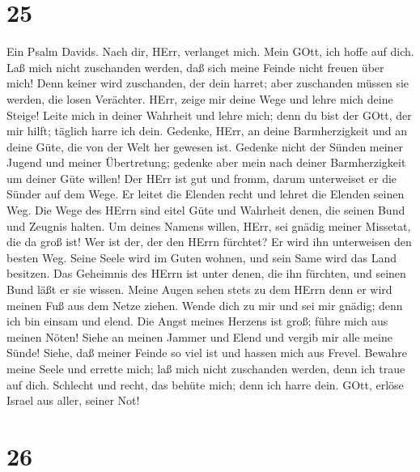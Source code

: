 \hypertarget{section-24}{%
\section{25}\label{section-24}}

 Ein Psalm Davids. Nach dir, HErr, verlanget mich.
 Mein GOtt, ich hoffe auf dich. Laß mich nicht zuschanden
werden, daß sich meine Feinde nicht freuen über mich!  Denn
keiner wird zuschanden, der dein harret; aber zuschanden müssen sie
werden, die losen Verächter.  HErr, zeige mir deine Wege und
lehre mich deine Steige!  Leite mich in deiner Wahrheit und
lehre mich; denn du bist der GOtt, der mir hilft; täglich harre ich
dein.  Gedenke, HErr, an deine Barmherzigkeit und an deine
Güte, die von der Welt her gewesen ist.  Gedenke nicht der
Sünden meiner Jugend und meiner Übertretung; gedenke aber mein nach
deiner Barmherzigkeit um deiner Güte willen!  Der HErr ist
gut und fromm, darum unterweiset er die Sünder auf dem Wege.
 Er leitet die Elenden recht und lehret die Elenden seinen
Weg.  Die Wege des HErrn sind eitel Güte und Wahrheit
denen, die seinen Bund und Zeugnis halten.  Um deines
Namens willen, HErr, sei gnädig meiner Missetat, die da groß ist!
 Wer ist der, der den HErrn fürchtet? Er wird ihn
unterweisen den besten Weg.  Seine Seele wird im Guten
wohnen, und sein Same wird das Land besitzen.  Das
Geheimnis des HErrn ist unter denen, die ihn fürchten, und seinen Bund
läßt er sie wissen.  Meine Augen sehen stets zu dem HErrn
denn er wird meinen Fuß aus dem Netze ziehen.  Wende dich
zu mir und sei mir gnädig; denn ich bin einsam und elend. 
Die Angst meines Herzens ist groß; führe mich aus meinen Nöten!
 Siehe an meinen Jammer und Elend und vergib mir alle meine
Sünde!  Siehe, daß meiner Feinde so viel ist und hassen
mich aus Frevel.  Bewahre meine Seele und errette mich; laß
mich nicht zuschanden werden, denn ich traue auf dich. 
Schlecht und recht, das behüte mich; denn ich harre dein. 
GOtt, erlöse Israel aus aller, seiner Not!

\hypertarget{section-25}{%
\section{26}\label{section-25}}

